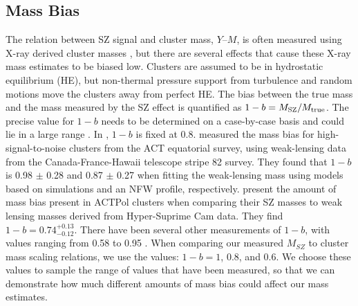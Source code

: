 \documentclass[a4paper,fleqn,usenatbib]{mnras}
\begin{document}
\subsection{Mass Bias}
The relation between SZ signal and cluster mass, $Y$--$M$, is often measured using X-ray derived cluster masses \citep{2010A&A...517A..92A, 2011ApJ...738...48A}, but there are several effects that cause these X-ray mass estimates to be biased low. 
Clusters are assumed to be in hydrostatic equilibrium (HE), but non-thermal pressure support from turbulence and random motions move the clusters away from perfect HE. 
The bias between the true mass and the mass measured by the SZ effect is quantified as $1-b = M_{\rm SZ}/M_{\rm true}$. 
The precise value for $1-b$ needs to be determined on a case-by-case basis and could lie in a large range \citep{2014A&A...571A..16P}. 
In \cite{2014A&A...571A..16P}, $1-b$ is fixed at 0.8. 
\cite{2016JCAP...08..013B} measured the mass bias for high-signal-to-noise clusters from the ACT equatorial survey, using weak-lensing data from the Canada-France-Hawaii telescope stripe 82 survey. 
They found that $1-b$ is 0.98 $\pm$ 0.28 and 0.87 $\pm$ 0.27 when fitting the weak-lensing mass using models based on simulations and an NFW profile, respectively. 
\cite{2018arXiv180405873M} present the amount of mass bias present in ACTPol clusters when comparing their SZ masses to weak lensing masses derived from Hyper-Suprime Cam data. They find $1-b = 0.74^{+0.13}_{-0.12}$.
There have been several other measurements of $1-b$, with values ranging from 0.58 to 0.95 \citep{2014MNRAS.443.1973V,2015MNRAS.449..685H,2016MNRAS.456L..74S,2016A&A...594A..24P}. 
When comparing our measured $M_{SZ}$ to cluster mass scaling relations, we use the values: $1-b = 1$, 0.8, and 0.6. 
We choose these values to sample the range of values that have been measured, so that we can demonstrate how much different amounts of mass bias could affect our mass estimates. 
\end{document}
